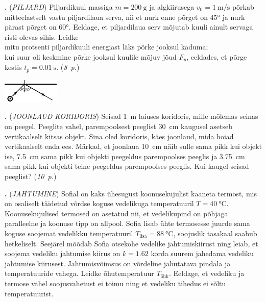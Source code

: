 \documentclass[11pt,a5paper]{article}
\newcommand{\numb}[1]{\vspace{5pt}\textbf{\large #1}}
\newcommand{\nimi}[1]{(\textsl{\small \uppercase{#1}})}
\newcommand{\punktid}[1]{(\emph{#1~p.})}
\newcounter{ylesanne}
\newcommand{\yl}[1]{\addtocounter{ylesanne}{1}\numb{\theylesanne.} \nimi{#1} \newblock{}}
\newcommand{\autor}[1]{}%
\begin{document}
\newpage
\yl{PILJARD}
Piljardikuul massiga $m=\SI{200}{\g}$ ja algkiirusega $v_0=\SI{1}{\m\per\s}$ põrkab mitteelastselt vastu piljardilaua serva, nii et nurk enne põrget on $\ang{45}$ ja nurk pärast põrget on $\ang{60}$. Eeldage, et piljardilaua serv mõjutab kuuli ainult servaga risti olevas sihis. Leidke\\
\osa mitu protsenti piljardikuuli energiast läks põrke jooksul kaduma;\\
\osa kui suur oli keskmine põrke jooksul kuulile mõjuv jõud $F_p$, eeldades, et põrge kestis $t_p=\SI{0.01}{\s}$.
\punktid{8} \autor{Richard Luhtaru}
\begin{center}
  \vspace{-1em}
  \includegraphics[width=0.6\linewidth]{piljard_joonis.pdf}
  \vspace{-1em}
\end{center}


\yl{Joonlaud koridoris}
Seisad \SI{1}{\m} laiuses koridoris, mille mõlemas seinas on peegel. Peeglite vahel, parempoolsest peeglist \SI{30}{\cm} kaugusel asetseb vertikaalselt kitsas objekt. Sina oled koridoris, käes joonlaud, mida hoiad vertikaalselt enda ees. Märkad, et joonlaua \SI{10}{\cm} näib sulle sama pikk kui objekt ise, \SI{7.5}{\cm} sama pikk kui objekti peegeldus parempoolses peeglis ja \SI{3.75}{\cm} sama pikk kui objekti teine peegeldus parempoolses peeglis. Kui kaugel seisad peeglist?
\punktid{10} \autor{Sandra Schumann}

\yl{Jahtumine}
Sofial on kaks ühesugust koonusekujulist kaaneta termost, mis on osaliselt täidetud võrdse koguse vedelikuga temperatuuril $T=\SI{40}{\celsius}$. Koonusekujulised termosed on asetatud nii, et vedelikupind on põhjaga paralleelne ja koonuse tipp on allpool. Sofia lisab ühte termosesse juurde sama koguse soojemat vedelikku temperatuuril $T_\text{lisa} = \SI{88}{\celsius}$, soojuslik tasakaal saabub hetkeliselt. Seejärel mõõdab Sofia otsekohe vedelike jahtumiskiirust ning leiab, et soojema vedeliku jahtumise kiirus on $k=\num{1.62}$ korda suurem jahedama vedeliku jahtumise kiirusest. Jahtumisvõimsus on võrdeline jahutatava pindala ja temperatuuride vahega. Leidke õhutemperatuur $T_\text{õhk}$. Eeldage, et vedeliku ja termose vahel soojusvahetust ei toimu ning et vedeliku tihedus ei sõltu temperatuurist.
\end{document}
